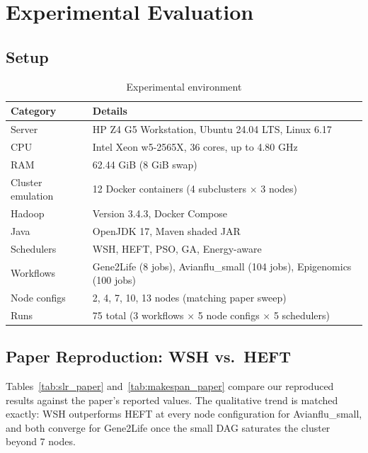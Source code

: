 \documentclass[12pt,a4paper]{article}
\begin{document}
\section{Experimental Evaluation}
\label{sec:evaluation}

\subsection{Setup}

\begin{table}[H]
\centering
\caption{Experimental environment}
\label{tab:setup}
\begin{tabular}{@{}ll@{}}
\toprule
\textbf{Category} & \textbf{Details} \\
\midrule
Server & HP Z4 G5 Workstation, Ubuntu 24.04 LTS, Linux 6.17 \\
CPU & Intel Xeon w5-2565X, 36 cores, up to 4.80 GHz \\
RAM & 62.44 GiB (8 GiB swap) \\
Cluster emulation & 12 Docker containers (4 subclusters $\times$ 3 nodes) \\
Hadoop & Version 3.4.3, Docker Compose \\
Java & OpenJDK 17, Maven shaded JAR \\
Schedulers & WSH, HEFT, PSO, GA, Energy-aware \\
Workflows & Gene2Life (8 jobs), Avianflu\_small (104 jobs), Epigenomics (100 jobs) \\
Node configs & 2, 4, 7, 10, 13 nodes (matching paper sweep) \\
Runs & 75 total (3 workflows $\times$ 5 node configs $\times$ 5 schedulers) \\
\bottomrule
\end{tabular}
\end{table}

\subsection{Paper Reproduction: WSH vs.\ HEFT}

Tables~\ref{tab:slr_paper} and~\ref{tab:makespan_paper} compare our reproduced results against the paper's reported values. The qualitative trend is matched exactly: WSH outperforms HEFT at every node configuration for Avianflu\_small, and both converge for Gene2Life once the small DAG saturates the cluster beyond 7 nodes.
\end{document}
